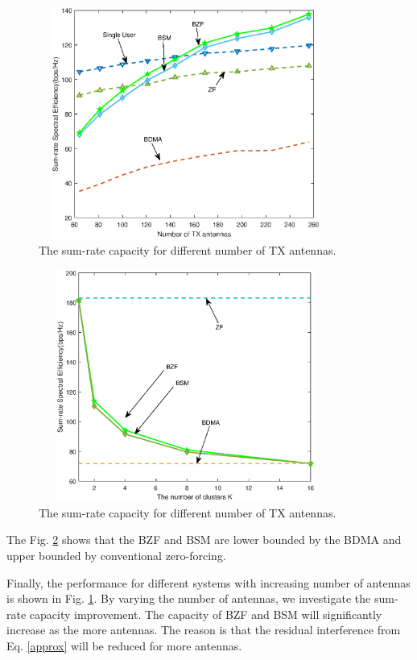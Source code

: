 \documentclass[conference]{IEEEtran}
\begin{document}
\begin{figure}[ht]
	\begin{center}
		\includegraphics[width=3.8in,height=3in]{Figure/antenna.eps}
		\caption{The sum-rate capacity for different number of TX antennas.}\label{fig:CDF}
	\end{center}
\end{figure}

\begin{figure}[ht]
	\begin{center}
		\includegraphics[width=3.8in,height=3in]{Figure/differentcluster.eps}
		\caption{The sum-rate capacity for different number of TX antennas.}\label{fig:differentK}
	\end{center}
\end{figure}
The Fig. \ref{fig:differentK} shows that the BZF and BSM are lower bounded by the BDMA and upper bounded by conventional zero-forcing.

Finally, the performance for different systems with increasing number of antennas is shown in Fig. \ref{fig:CDF}. By varying the number of antennas, we investigate the sum-rate capacity improvement. The capacity of BZF and BSM will significantly increase as the more antennas. The reason is that the residual interference from Eq. \eqref{approx} will be reduced for more antennas.
\end{document}
